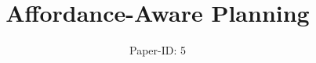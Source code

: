 \documentclass[conference]{IEEEtran}
\begin{document}
\title{Affordance-Aware Planning}

\author{Paper-ID: 5}





% 


\maketitle
\end{document}
